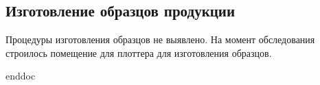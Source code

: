\subsection{Изготовление образцов продукции}
\label{bp:pattern}


Процедуры изготовления образцов не выявлено. На момент обследования строилось помещение для плоттера для изготовления образцов. 



 {enddoc}